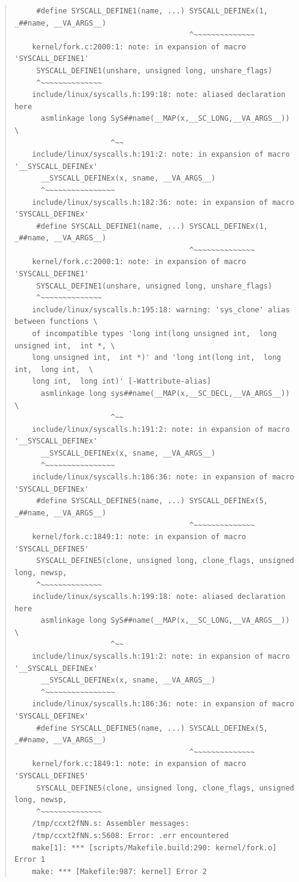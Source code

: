 \documentclass{article}
\begin{document}
\begin{quote}
\begin{verbatim}
	 #define SYSCALL_DEFINE1(name, ...) SYSCALL_DEFINEx(1, _##name, __VA_ARGS__)
	                                    ^~~~~~~~~~~~~~~
	kernel/fork.c:2000:1: note: in expansion of macro 'SYSCALL_DEFINE1'
	 SYSCALL_DEFINE1(unshare, unsigned long, unshare_flags)
	 ^~~~~~~~~~~~~~~
	include/linux/syscalls.h:199:18: note: aliased declaration here
	  asmlinkage long SyS##name(__MAP(x,__SC_LONG,__VA_ARGS__)) \
	                  ^~~
	include/linux/syscalls.h:191:2: note: in expansion of macro '__SYSCALL_DEFINEx'
	  __SYSCALL_DEFINEx(x, sname, __VA_ARGS__)
	  ^~~~~~~~~~~~~~~~~
	include/linux/syscalls.h:182:36: note: in expansion of macro 'SYSCALL_DEFINEx'
	 #define SYSCALL_DEFINE1(name, ...) SYSCALL_DEFINEx(1, _##name, __VA_ARGS__)
	                                    ^~~~~~~~~~~~~~~
	kernel/fork.c:2000:1: note: in expansion of macro 'SYSCALL_DEFINE1'
	 SYSCALL_DEFINE1(unshare, unsigned long, unshare_flags)
	 ^~~~~~~~~~~~~~~
	include/linux/syscalls.h:195:18: warning: 'sys_clone' alias between functions \
	of incompatible types 'long int(long unsigned int,  long unsigned int,  int *, \
	long unsigned int,  int *)' and 'long int(long int,  long int,  long int,  \
	long int,  long int)' [-Wattribute-alias]
	  asmlinkage long sys##name(__MAP(x,__SC_DECL,__VA_ARGS__)) \
	                  ^~~
	include/linux/syscalls.h:191:2: note: in expansion of macro '__SYSCALL_DEFINEx'
	  __SYSCALL_DEFINEx(x, sname, __VA_ARGS__)
	  ^~~~~~~~~~~~~~~~~
	include/linux/syscalls.h:186:36: note: in expansion of macro 'SYSCALL_DEFINEx'
	 #define SYSCALL_DEFINE5(name, ...) SYSCALL_DEFINEx(5, _##name, __VA_ARGS__)
	                                    ^~~~~~~~~~~~~~~
	kernel/fork.c:1849:1: note: in expansion of macro 'SYSCALL_DEFINE5'
	 SYSCALL_DEFINE5(clone, unsigned long, clone_flags, unsigned long, newsp,
	 ^~~~~~~~~~~~~~~
	include/linux/syscalls.h:199:18: note: aliased declaration here
	  asmlinkage long SyS##name(__MAP(x,__SC_LONG,__VA_ARGS__)) \
	                  ^~~
	include/linux/syscalls.h:191:2: note: in expansion of macro '__SYSCALL_DEFINEx'
	  __SYSCALL_DEFINEx(x, sname, __VA_ARGS__)
	  ^~~~~~~~~~~~~~~~~
	include/linux/syscalls.h:186:36: note: in expansion of macro 'SYSCALL_DEFINEx'
	 #define SYSCALL_DEFINE5(name, ...) SYSCALL_DEFINEx(5, _##name, __VA_ARGS__)
	                                    ^~~~~~~~~~~~~~~
	kernel/fork.c:1849:1: note: in expansion of macro 'SYSCALL_DEFINE5'
	 SYSCALL_DEFINE5(clone, unsigned long, clone_flags, unsigned long, newsp,
	 ^~~~~~~~~~~~~~~
	/tmp/ccxt2fNN.s: Assembler messages:
	/tmp/ccxt2fNN.s:5608: Error: .err encountered
	make[1]: *** [scripts/Makefile.build:290: kernel/fork.o] Error 1
	make: *** [Makefile:987: kernel] Error 2
\end{verbatim}
\end{quote}
\end{document}
